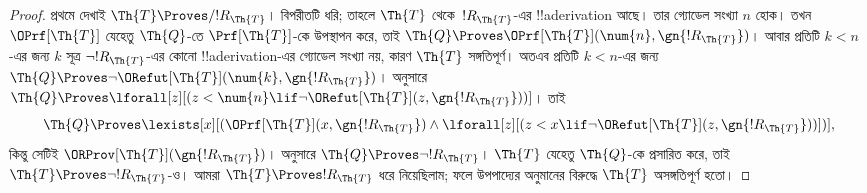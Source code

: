 \documentclass[../../../include/open-logic-section]{subfiles}
\begin{document}
\begin{proof}
প্রথমে দেখাই $\Th{T} \Proves/ !R_{\Th{T}}$। বিপরীতটি ধরি; তাহলে
$\Th{T}$ থেকে~$!R_{\Th{T}}$-এর !!a{derivation} আছে। তার গ্যোডেল সংখ্যা
$n$ হোক। তখন $\OPrf[\Th{T}]$ যেহেতু $\Th{Q}$-তে
$\Prf[\Th{T}]$-কে উপস্থাপন করে, তাই $\Th{Q} \Proves
\OPrf[\Th{T}](\num{n}, \gn{!R_{\Th{T}}})$। আবার প্রতিটি $k < n$-এর
জন্য $k$ সূত্র $\lnot !R_{\Th{T}}$-এর কোনো !!a{derivation}-এর গ্যোডেল
সংখ্যা নয়, কারণ $\Th{T}$ সঙ্গতিপূর্ণ। অতএব প্রতিটি $k < n$-এর জন্য
$\Th{Q} \Proves \lnot \ORefut[\Th{T}](\num{k}, \gn{!R_{\Th{T}}})$।
 অনুসারে $\Th{Q} \Proves
\lforall[z][(z < \num{n} \lif \lnot \ORefut[\Th{T}](z,
  \gn{!R_{\Th{T}}}))]$। তাই
\[
\Th{Q} \Proves \lexists[x][(\OPrf[\Th{T}](x,\gn{!R_{\Th{T}}}) \land \lforall[z][(z
    < x \lif \lnot \ORefut[\Th{T}](z,\gn{!R_{\Th{T}}}))])],
\]
কিন্তু সেটিই $\ORProv[\Th{T}](\gn{!R_{\Th{T}}})$।  অনুসারে
$\Th{Q} \Proves \lnot !R_{\Th{T}}$। $\Th{T}$ যেহেতু $\Th{Q}$-কে
প্রসারিত করে, তাই $\Th{T} \Proves \lnot !R_{\Th{T}}$-ও। আমরা
$\Th{T} \Proves !R_{\Th{T}}$ ধরে নিয়েছিলাম; ফলে উপপাদ্যের অনুমানের
বিরুদ্ধে $\Th{T}$ অসঙ্গতিপূর্ণ হতো।


\end{proof}
\end{document}
